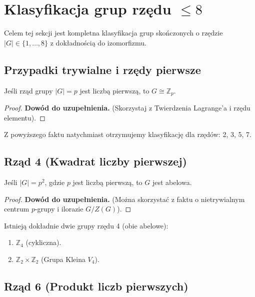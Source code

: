 \section{Klasyfikacja grup rzędu $\le 8$}

\begin{goall}
    Celem tej sekcji jest kompletna klasyfikacja grup skończonych o rzędzie $|G| \in \{1, \dots, 8\}$ z dokładnością do izomorfizmu.
\end{goall}

\subsection{Przypadki trywialne i rzędy pierwsze}

\begin{fact}
    Jeśli rząd grupy $|G| = p$ jest liczbą pierwszą, to $G \cong \mathbb{Z}_p$.
\end{fact}
\begin{proof}
    \textbf{Dowód do uzupełnienia.} (Skorzystaj z Twierdzenia Lagrange'a i rzędu elementu).
\end{proof}

\noindent Z powyższego faktu natychmiast otrzymujemy klasyfikację dla rzędów: 2, 3, 5, 7.

\subsection{Rząd 4 (Kwadrat liczby pierwszej)}

\begin{fact}
    Jeśli $|G| = p^2$, gdzie $p$ jest liczbą pierwszą, to $G$ jest abelowa.
\end{fact}
\begin{proof}
    \textbf{Dowód do uzupełnienia.} (Można skorzystać z faktu o nietrywialnym centrum $p$-grupy i ilorazie $G/Z(G)$).
\end{proof}

\begin{corollary}
    Istnieją dokładnie dwie grupy rzędu 4 (obie abelowe):
    \begin{enumerate}
        \item $\mathbb{Z}_4$ (cykliczna).
        \item $\mathbb{Z}_2 \times \mathbb{Z}_2$ (Grupa Kleina $V_4$).
    \end{enumerate}
\end{corollary}

\subsection{Rząd 6 (Produkt liczb pierwszych)}

